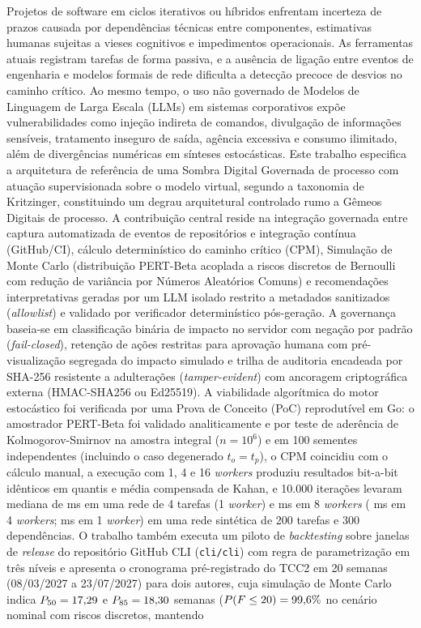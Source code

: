\documentclass[12pt,openany,oneside,a4paper,english,brazilian,sumario=tradicional]{abntex2}
\begin{document}
\begin{resumo}
Projetos de software em ciclos iterativos ou híbridos enfrentam incerteza de prazos causada por dependências técnicas entre componentes, estimativas humanas sujeitas a vieses cognitivos e impedimentos operacionais. As ferramentas atuais registram tarefas de forma passiva, e a ausência de ligação entre eventos de engenharia e modelos formais de rede dificulta a detecção precoce de desvios no caminho crítico. Ao mesmo tempo, o uso não governado de Modelos de Linguagem de Larga Escala (LLMs) em sistemas corporativos expõe vulnerabilidades como injeção indireta de comandos, divulgação de informações sensíveis, tratamento inseguro de saída, agência excessiva e consumo ilimitado, além de divergências numéricas em sínteses estocásticas. Este trabalho especifica a arquitetura de referência de uma Sombra Digital Governada de processo com atuação supervisionada sobre o modelo virtual, segundo a taxonomia de Kritzinger, constituindo um degrau arquitetural controlado rumo a Gêmeos Digitais de processo. A contribuição central reside na integração governada entre captura automatizada de eventos de repositórios e integração contínua (GitHub/CI), cálculo determinístico do caminho crítico (CPM), Simulação de Monte Carlo (distribuição PERT-Beta acoplada a riscos discretos de Bernoulli com redução de variância por Números Aleatórios Comuns) e recomendações interpretativas geradas por um LLM isolado restrito a metadados sanitizados (\textit{allowlist}) e validado por verificador determinístico pós-geração. A governança baseia-se em classificação binária de impacto no servidor com negação por padrão (\textit{fail-closed}), retenção de ações restritas para aprovação humana com pré-visualização segregada do impacto simulado e trilha de auditoria encadeada por SHA-256 resistente a adulterações (\textit{tamper-evident}) com ancoragem criptográfica externa (HMAC-SHA256 ou Ed25519). A viabilidade algorítmica do motor estocástico foi verificada por uma Prova de Conceito (PoC) reprodutível em Go: o amostrador PERT-Beta foi validado analiticamente e por teste de aderência de Kolmogorov-Smirnov na amostra integral ($n=10^6$) e em 100 sementes independentes (incluindo o caso degenerado $t_o=t_p$), o CPM coincidiu com o cálculo manual, a execução com 1, 4 e 16 \textit{workers} produziu resultados bit-a-bit idênticos em quantis e média compensada de Kahan, e 10.000 iterações levaram mediana de \benchBaseMedMs{} ms em uma rede de 4 tarefas (1 \textit{worker}) e \benchSynthWEightMedMs{} ms em 8 \textit{workers} (\benchSynthWFourMedMs{} ms em 4 \textit{workers}; \benchSynthWOneMedMs{} ms em 1 \textit{worker}) em uma rede sintética de 200 tarefas e 300 dependências. O trabalho também executa um piloto de \textit{backtesting} sobre janelas de \textit{release} do repositório GitHub CLI (\texttt{cli/cli}) com regra de parametrização em três níveis e apresenta o cronograma pré-registrado do TCC2 em 20 semanas (08/03/2027 a 23/07/2027) para dois autores, cuja simulação de Monte Carlo indica $P_{50}=17{,}29{}$ e $P_{85}=18{,}30{}$ semanas ($P(F \le 20)=99{,}6{}\%$ no cenário nominal com riscos discretos, mantendo 
\end{resumo}
\end{document}
